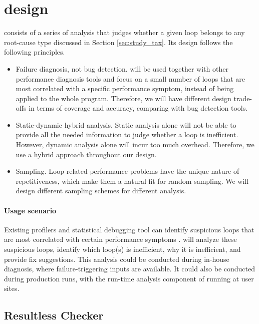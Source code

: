 \section{\Tool design}
\label{sec:design}
\Tool consists of a series of analysis that
judges whether a given loop belongs to any root-cause type discussed in
Section \ref{sec:study_tax}.
Its design
follows the following principles.
\begin{itemize}
\item Failure diagnosis, not bug detection. \Tool will be  
used together with other performance diagnosis tools \cite{SongOOPSLA2014}
and focus on a small
number of loops that are most correlated with a specific performance symptom,
instead of being applied to the whole program. Therefore, we will have different
design trade-offs in terms of coverage and accuracy, comparing with 
bug detection tools.

\item Static-dynamic hybrid analysis. Static analysis alone
will not be able to provide all the needed information to judge whether
a loop is inefficient. However, 
dynamic analysis alone will incur too much overhead.
Therefore, we use a hybrid approach throughout our design.

\item Sampling. Loop-related 
performance problems have the unique nature of repetitiveness, which make 
them a natural fit for random sampling. We will design different
sampling schemes for different analysis.
\end{itemize}

\paragraph{Usage scenario}
Existing profilers and statistical debugging tool can
identify suspicious loops that are most correlated with 
certain performance 
symptoms \cite{SongOOPSLA2014}. 
\Tool will analyze
these suspicious loops, identify which loop(s) is inefficient, why it is
inefficient, and provide fix suggestions. This analysis could be
conducted during in-house diagnosis, where failure-triggering inputs
are available. It could also be conducted during production runs, with
the run-time analysis component of \Tool running 
at user sites.



\subsection{Resultless Checker}
\label{sec:workless}

